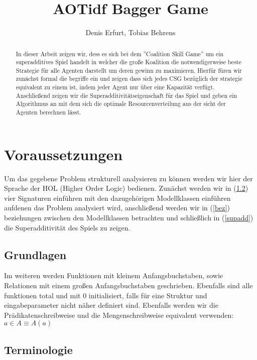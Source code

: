 \documentclass[12pt]{article}
\theoremstyle{break}
\begin{document}
\title{AOTidf Bagger Game}
\author{Denis Erfurt, Tobias Behrens}

\begin{abstract}
  In dieser Arbeit zeigen wir, dess es sich bei dem ''Coalition Skill Game'' um ein superadditives Spiel handelt in welcher die große Koalition die notwendigerweise beste Strategie für alle Agenten darstellt um deren gewinn zu maximieren. Hierfür füren wir zunächst formal die begriffe ein und zeigen dass sich jedes CSG bezüglich der strategie equivalent zu einem ist, indem jeder Agent nur über eine Kapazität verfügt. Anschließend zeigen wir die Superadditivitätseigenschaft für das Spiel und geben ein Algorithmus an mit dem sich die optimale Resourcenverteilung aus der sicht der Agenten berechnen lässt.
\end{abstract}



\maketitle


\section{Voraussetzungen}

Um das gegebene Problem strukturell analysieren zu können werden wir hier der Sprache der HOL (Higher Order Logic) bedienen. Zunächst werden wir in (\ref{sigmod}) vier Signaturen einführen mit den dazugehörigen Modellklassen einführen aufdenen das Problem analysiert wird, anschließend werden wir in (\ref{bez}) beziehungen zwischen den Modellklassen betrachten und schließlich in (\ref{supadd}) die Superadditivität des Spiels zu zeigen.
 
\subsection{Grundlagen}

  Im weiteren werden Funktionen mit kleinem Anfangsbuchstaben, sowie Relationen mit einem großen Anfangsbuchstaben geschrieben. Ebenfalls sind alle funktionen total und mit 0 initialisiert, falls für eine Struktur und eingabeparameter nicht näher definiert sind.
  Ebenfalls werden wir die Prädikatenschreibweise und die Mengenschreibweise equivalent verwenden: $a\in A \equiv A(a)$

\subsection{Terminologie}
\label{sigmod}
\end{document}
